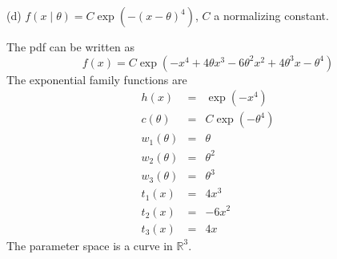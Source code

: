 \bigskip
\noindent
(d) $f(x\mid\theta)=C\exp(-(x-\theta)^4)$, $C$ a normalizing
constant.

\bigskip
\noindent
The pdf can be written as
$$f(x)=C
\exp(-x^4+4\theta x^3-6\theta^2x^2+4\theta^3x-\theta^4)$$
The exponential family functions are
\begin{eqnarray*}
h(x)&=&\exp(-x^4)\\
c(\theta)&=&C\exp(-\theta^4)\\
w_1(\theta)&=&\theta\\
w_2(\theta)&=&\theta^2\\
w_3(\theta)&=&\theta^3\\
t_1(x)&=&4x^3\\
t_2(x)&=&-6x^2\\
t_3(x)&=&4x
\end{eqnarray*}
The parameter space
is a curve in $\mathbb R^3$.





